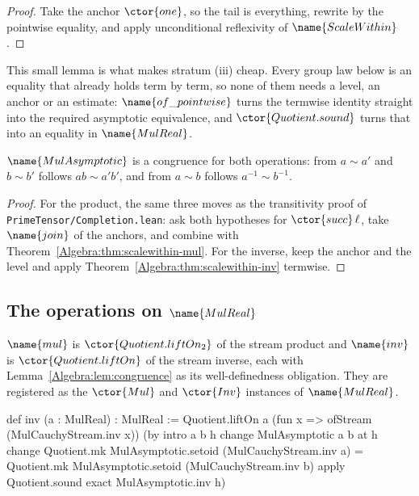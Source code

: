 \begin{proof}
Take the anchor $\ctor{one}$, so the tail is everything, rewrite by the
pointwise equality, and apply unconditional reflexivity of
$\name{ScaleWithin}$.
\end{proof}

This small lemma is what makes stratum (iii) cheap.  Every group law below is
an equality that already holds term by term, so none of them needs a level, an
anchor or an estimate: $\name{of\_pointwise}$ turns the termwise identity
straight into the required asymptotic equivalence, and $\ctor{Quotient.sound}$
turns that into an equality in $\name{MulReal}$.

\begin{lemma}
\label{Algebra:lem:congruence}
$\name{MulAsymptotic}$ is a congruence for both operations: from
$a \sim a'$ and $b \sim b'$ follows $ab \sim a'b'$, and from $a \sim b$ follows
$a^{-1} \sim b^{-1}$.
\end{lemma}

\begin{proof}
For the product, the same three moves as the transitivity proof of
\texttt{PrimeTensor/Completion.lean}: ask both hypotheses for
$\ctor{succ}\,\ell$, take $\name{join}$ of the anchors, and combine with
Theorem~\ref{Algebra:thm:scalewithin-mul}.  For the inverse, keep the anchor
and the level and apply Theorem~\ref{Algebra:thm:scalewithin-inv} termwise.
\end{proof}

\subsection{The operations on \texorpdfstring{$\name{MulReal}$}{MulReal}}

\begin{definition}
\label{Algebra:def:mulreal-ops}
$\name{mul}$ is $\ctor{Quotient.liftOn_2}$ of the stream product and
$\name{inv}$ is $\ctor{Quotient.liftOn}$ of the stream inverse, each with
Lemma~\ref{Algebra:lem:congruence} as its well-definedness obligation.  They
are registered as the $\ctor{Mul}$ and $\ctor{Inv}$ instances of
$\name{MulReal}$.
\end{definition}

\begin{leancode}
def inv (a : MulReal) : MulReal :=
  Quotient.liftOn a
    (fun x => ofStream (MulCauchyStream.inv x))
    (by
      intro a b h
      change MulAsymptotic a b at h
      change
        Quotient.mk MulAsymptotic.setoid (MulCauchyStream.inv a) =
          Quotient.mk MulAsymptotic.setoid (MulCauchyStream.inv b)
      apply Quotient.sound
      exact MulAsymptotic.inv h)
\end{leancode}

